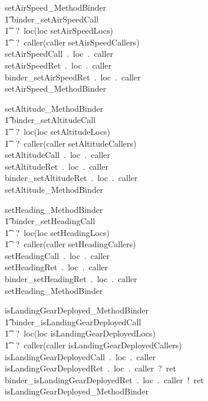 %
%
\begin{circusaction}
setAirSpeed\_MethodBinder \circdef \\
	\t1 \circblockopen
	binder\_setAirSpeedCall\\ \t1 ~?~loc\prefixcolon(loc \in setAirSpeedLocs)\\ \t1 ~?~caller\prefixcolon(caller \in setAirSpeedCallers)  \cross {}  \then \\
	setAirSpeedCall~.~loc~.~caller  \cross {}  \then \\
	setAirSpeedRet~.~loc~.~caller \then \\
	binder\_setAirSpeedRet~.~loc~.~caller  \then \\
	setAirSpeed\_MethodBinder
	\circblockclose
\end{circusaction}
%
%
\begin{circusaction}
setAltitude\_MethodBinder \circdef \\
	\t1 \circblockopen
	binder\_setAltitudeCall\\ \t1 ~?~loc\prefixcolon(loc \in setAltitudeLocs)\\ \t1 ~?~caller\prefixcolon(caller \in setAltitudeCallers)  \cross {}  \then \\
	setAltitudeCall~.~loc~.~caller  \cross {}  \then \\
	setAltitudeRet~.~loc~.~caller \then \\
	binder\_setAltitudeRet~.~loc~.~caller  \then \\
	setAltitude\_MethodBinder
	\circblockclose
\end{circusaction}
%
%
\begin{circusaction}
setHeading\_MethodBinder \circdef \\
	\t1 \circblockopen
	binder\_setHeadingCall\\ \t1 ~?~loc\prefixcolon(loc \in setHeadingLocs)\\ \t1 ~?~caller\prefixcolon(caller \in setHeadingCallers)  \cross {}  \then \\
	setHeadingCall~.~loc~.~caller  \cross {}  \then \\
	setHeadingRet~.~loc~.~caller \then \\
	binder\_setHeadingRet~.~loc~.~caller  \then \\
	setHeading\_MethodBinder
	\circblockclose
\end{circusaction}
%
%
\begin{circusaction}
isLandingGearDeployed\_MethodBinder \circdef \\
	\t1 \circblockopen
	binder\_isLandingGearDeployedCall\\ \t1 ~?~loc\prefixcolon(loc \in isLandingGearDeployedLocs)\\ \t1 ~?~caller\prefixcolon(caller \in isLandingGearDeployedCallers)  \then \\
	isLandingGearDeployedCall~.~loc~.~caller  \then \\
	isLandingGearDeployedRet~.~loc~.~caller~?~ret \then \\
	binder\_isLandingGearDeployedRet~.~loc~.~caller~!~ret  \then \\
	isLandingGearDeployed\_MethodBinder
	\circblockclose
\end{circusaction}

